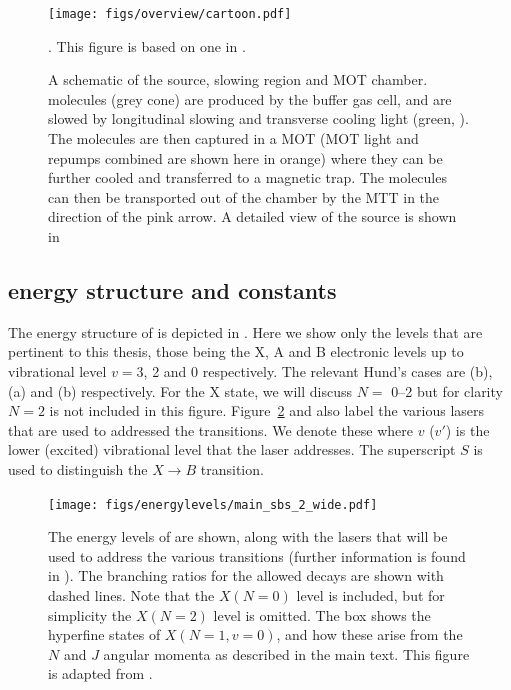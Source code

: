 \begin{figure}
  \centering
  \texttt{[image: figs/overview/cartoon.pdf]}
  \caption{A schematic of the \CaF{} source, slowing region and MOT chamber.
  \CaF{} molecules (grey cone) are produced by the buffer gas cell, and are
  slowed by longitudinal slowing and transverse cooling light (green,
  ). The molecules are then captured in a MOT (MOT light
   and repumps combined are shown here in orange) where
  they can be further cooled and transferred to a magnetic trap. The molecules
  can then be transported out of the chamber by the MTT in the direction of the
  pink arrow. A detailed view of the source is shown in
  }. This figure is based on one in
  .
  \label{overview:fig:CaFcartoon}
\end{figure}

\subsection*{\CaF{} energy structure and constants}

The energy structure of \CaF{} is depicted in
. Here we show only the levels that are
pertinent to this thesis, those being the X, A and B electronic levels up to
vibrational level $v=3$, 2 and 0 respectively. The relevant Hund's cases are
(b), (a) and (b) respectively. For the X state, we will discuss $N=$
\numrange{0}{2} but for clarity $N=2$ is not included in this figure.
%
Figure~\ref{overview:fig:CaFenergy} and  also
label the various lasers that are used to addressed the \CaF{} transitions. We
denote these  where $v$ ($v'$) is the lower (excited)
vibrational level that the laser addresses. The superscript $S$ is used to
distinguish the $X\rightarrow B$ transition.

\begin{figure}
  \centering
  \texttt{[image: figs/energylevels/main\_sbs\_2\_wide.pdf]}
  \caption{
    The energy levels of \CaF{} are shown, along with the lasers that will be
    used to address the various transitions (further information is found in
    ). The branching ratios for the allowed
    decays are shown with dashed lines. Note that the $X(N=0)$ level is
    included, but for simplicity the $X(N=2)$ level is omitted. The box shows
    the hyperfine states of $X(N=1, v=0)$, and how these arise from the $N$ and
    $J$ angular momenta as described in the main text. This figure is adapted from
    . 
  }
  \label{overview:fig:CaFenergy}
\end{figure}


